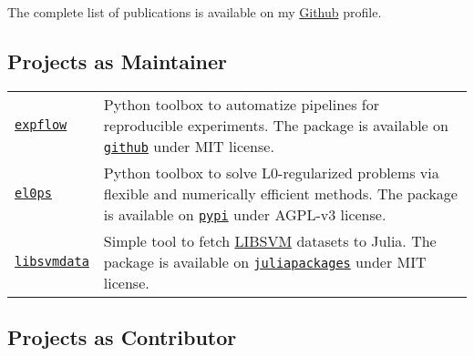 The complete list of publications is available on my \href{https://github.com/TheoGuyard}{Github} profile.

\subsection*{Projects as Maintainer}
\label{tools:projects-as-maintainer}

\begin{longtable}[l]{@{}p{}p{}}
    \href{https://github.com/TheoGuyard/ExpFlow/tree/main}{\texttt{expflow}} & Python toolbox to automatize pipelines for reproducible experiments. The package is available on \href{https://github.com/TheoGuyard/ExpFlow/tree/main}{\texttt{github}} under MIT license.\\
    \href{https://github.com/TheoGuyard/El0ps/tree/main}{\texttt{el0ps}} & Python toolbox to solve L0-regularized problems via flexible and numerically efficient methods. The package is available on \href{https://pypi.org/project/el0ps/}{\texttt{pypi}} under AGPL-v3 license. \\
    \href{https://github.com/TheoGuyard/LIBSVMdata.jl}{\texttt{libsvmdata}} & Simple tool to fetch \href{https://www.csie.ntu.edu.tw/~cjlin/libsvmtools/datasets/}{LIBSVM} datasets to Julia. The package is available on \href{https://juliapackages.com/packages/libsvmdata}{\texttt{juliapackages}} under MIT license. \\
\end{longtable}

\subsection*{Projects as Contributor}
\label{tools:projects-as-contributor}

